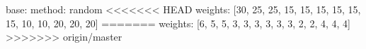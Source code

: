 base:
  method: random
<<<<<<< HEAD
  weights: [30, 25, 25, 15, 15, 15, 15, 15, 15, 10, 10, 20, 20, 20]
=======
  weights: [6, 5, 5, 3, 3, 3, 3, 3, 3, 2, 2, 4, 4, 4]
>>>>>>> origin/master
